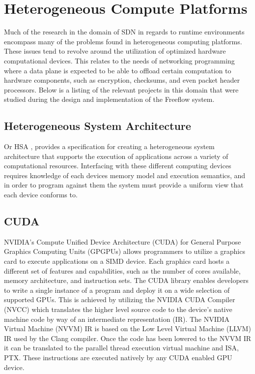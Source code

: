 \section{Heterogeneous Compute Platforms}
\label{related:hcp}
Much of the research in the domain of SDN in regards to runtime environments
encompass many of the problems found in heterogeneous computing platforms.
These issues tend to revolve around the utilization of optimized hardware
computational devices. This relates to the needs of networking programming
where a data plane is expected to be able to offload certain computation to
hardware components, such as encryption, checksums, and even packet header
processors. Below is a listing of the relevant projects in this domain that
were studied during the design and implementation of the Freeflow system.

\subsection{Heterogeneous System Architecture}
\label{related:hcp:hsa}
Or HSA \cite{hsa}, provides a specification for creating a heterogeneous
system architecture that supports the execution of applications across a
variety of computational resources. Interfacing with these different computing
devices requires knowledge of each devices memory model and execution
semantics, and in order to program against them the system must provide a
uniform view that each device conforms to.

\subsection{CUDA}
\label{related:hcp:cuda}
NVIDIA's Compute Unified Device Architecture (CUDA) \cite{cuda} for General
Purpose Graphics Computing Units (GPGPUs) allows programmers to utilize a
graphics card to execute applications on a SIMD device. Each graphics card
hosts a different set of features and capabilities, such as the number of cores
available, memory architecture, and instruction sets. The CUDA library
enables developers to write a single instance of a program and deploy
it on a wide selection of supported GPUs. This is achieved by utilizing the
NVIDIA CUDA Compiler (NVCC) which translates the higher level source code
to the device's native machine code by way of an intermediate representation
(IR). The NVIDIA Virtual Machine (NVVM) IR is based on the Low Level Virtual
Machine (LLVM) IR used by the Clang compiler. Once the code has been lowered
to the NVVM IR it can be translated to the parallel thread execution virtual
machine and ISA, PTX. These instructions are executed natively by any CUDA
enabled GPU device.

